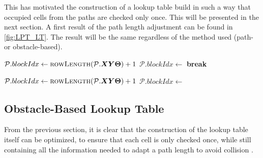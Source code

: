 This has motivated the construction of a lookup table build in such a way that occupied cells from the paths are checked only once. This will be presented in the next section. A first result of the path length adjustment can be found in \cref{fig:LPT_LT}. The result will be the same regardless of the method used (path- or obstacle-based).

\begin{algorithm}
\begin{algorithmic}[1]
\Statex
{}
\State $\mathcal{P}.blockIdx \gets \Call{rowLength}{\mathcal{P}.\bm{XY\Theta}}+1$ 
\State $\mathcal{P}.blockIdx \gets $ 
\State \textbf{break} 
\EndIf
\EndFor
\EndFor
\end{algorithmic}
\end{algorithm}

\begin{algorithm}
\begin{algorithmic}[1]
\Statex
{}
\State $\mathcal{P}.blockIdx \gets \Call{rowLength}{\mathcal{P}.\bm{XY\Theta}}+1$ 
\EndFor
{}
\State $\mathcal{P}.blockIdx \gets $ 
\EndIf
\EndFor
\EndIf
\EndFor
\end{algorithmic}
\end{algorithm}

\subsection{Obstacle-Based Lookup Table} \label{sec:OBLT}
From the previous section, it is clear that the construction of the lookup table itself can be optimized, to ensure that each cell is only checked once, while still containing all the information needed to adapt a path length to avoid collision \cite{DemeesterEtAl2012}.

